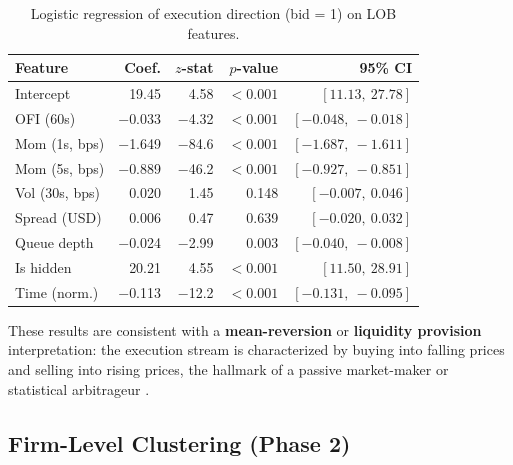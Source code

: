 \documentclass[11pt, letterpaper]{article}
\begin{document}
\begin{table}[H]
\centering
\caption{Logistic regression of execution direction (bid = 1) on LOB features.}
\label{tab:regression}
\begin{tabular}{@{} l r r r r @{}}
\toprule
\textbf{Feature} & \textbf{Coef.} & \textbf{$z$-stat} &
\textbf{$p$-value} & \textbf{95\% CI} \\
\midrule
Intercept      &  19.45 &   4.58 & $<0.001$ & $[11.13,\ 27.78]$ \\
OFI (60s)      & $-$0.033 & $-$4.32 & $<0.001$ & $[-0.048,\ -0.018]$ \\
Mom (1s, bps)  & $-$1.649 & $-$84.6 & $<0.001$ & $[-1.687,\ -1.611]$ \\
Mom (5s, bps)  & $-$0.889 & $-$46.2 & $<0.001$ & $[-0.927,\ -0.851]$ \\
Vol (30s, bps) &   0.020 &   1.45 & 0.148    & $[-0.007,\ 0.046]$ \\
Spread (USD)   &   0.006 &   0.47 & 0.639    & $[-0.020,\ 0.032]$ \\
Queue depth    & $-$0.024 & $-$2.99 & 0.003    & $[-0.040,\ -0.008]$ \\
Is hidden      &  20.21 &   4.55 & $<0.001$ & $[11.50,\ 28.91]$ \\
Time (norm.)   & $-$0.113 & $-$12.2 & $<0.001$ & $[-0.131,\ -0.095]$ \\
\bottomrule
\end{tabular}
\end{table}

These results are consistent with a \textbf{mean-reversion} or
\textbf{liquidity provision} interpretation: the execution stream is
characterized by buying into falling prices and selling into rising prices,
the hallmark of a passive market-maker or statistical arbitrageur
\citep{Menkveld2013,AvellanedaStoikov2008}.

\subsection{Firm-Level Clustering (Phase 2)}
\end{document}
